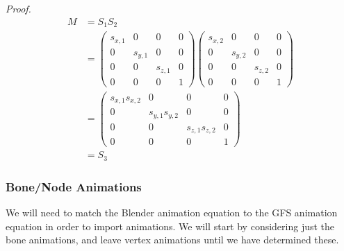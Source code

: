 \documentclass{article}
\begin{document}
\noindent\textit{Proof.}
\begin{align}
M &= S_1 S_2 \\
&=
\begin{pmatrix}
s_{x, 1} & 0 & 0 & 0\\
0 & s_{y, 1} & 0 & 0\\
0 & 0 & s_{z, 1} & 0\\
0 & 0 & 0 & 1
\end{pmatrix}
\begin{pmatrix}
s_{x, 2} & 0 & 0 & 0\\
0 & s_{y, 2} & 0 & 0\\
0 & 0 & s_{z, 2} & 0\\
0 & 0 & 0 & 1
\end{pmatrix}\\
&=
\begin{pmatrix}
s_{x, 1} s_{x, 2} & 0 & 0 & 0\\
0 & s_{y, 1} s_{y, 2} & 0 & 0\\
0 & 0 & s_{z, 1} s_{z, 2} & 0\\
0 & 0 & 0 & 1
\end{pmatrix}\\
&= S_3
\end{align}


\clearpage
\subsubsection{Bone/Node Animations}
We will need to match the Blender animation equation to the GFS animation equation in order to import animations. We will start by considering just the bone animations, and leave vertex animations until we have determined these.
\end{document}
